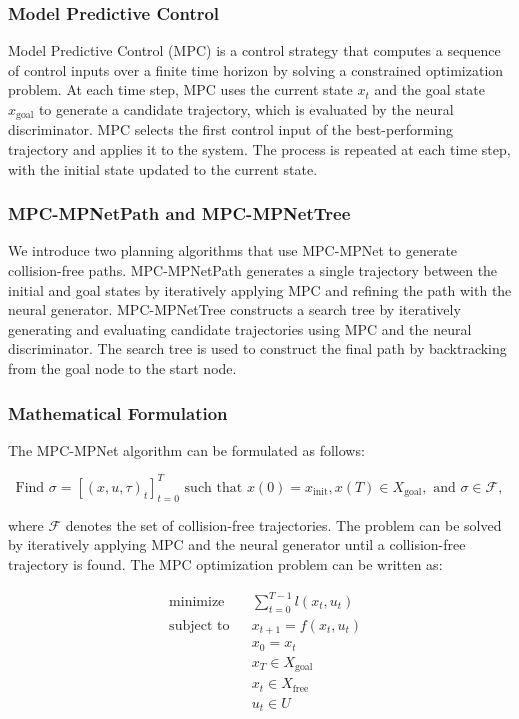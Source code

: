 \subsubsection{Model Predictive Control}

Model Predictive Control (MPC) is a control strategy that computes a sequence of control inputs over a finite time horizon by solving a constrained optimization problem. At each time step, MPC uses the current state $x_t$ and the goal state $x_{\text{goal}}$ to generate a candidate trajectory, which is evaluated by the neural discriminator. MPC selects the first control input of the best-performing trajectory and applies it to the system. The process is repeated at each time step, with the initial state updated to the current state.

\subsubsection{MPC-MPNetPath and MPC-MPNetTree}

We introduce two planning algorithms that use MPC-MPNet to generate collision-free paths. MPC-MPNetPath generates a single trajectory between the initial and goal states by iteratively applying MPC and refining the path with the neural generator. MPC-MPNetTree constructs a search tree by iteratively generating and evaluating candidate trajectories using MPC and the neural discriminator. The search tree is used to construct the final path by backtracking from the goal node to the start node.

\subsubsection{Mathematical Formulation}

The MPC-MPNet algorithm can be formulated as follows:

\begin{equation}
    \text{Find } \sigma = \left[(x, u, \tau)_t\right]_{t=0}^{T} \text{ such that } x(0) = x_{\text{init}}, x(T) \in X_{\text{goal}}, \text{ and } \sigma \in \mathcal{F},
\end{equation}

where $\mathcal{F}$ denotes the set of collision-free trajectories. The problem can be solved by iteratively applying MPC and the neural generator until a collision-free trajectory is found. The MPC optimization problem can be written as:

\begin{equation}
    \begin{aligned}
        &\text{minimize} && \sum_{t=0}^{T-1} l(x_t, u_t) \\
        &\text{subject to} && x_{t+1} = f(x_t, u_t) \\
        &&& x_0 = x_t \\
        &&& x_T \in X_{\text{goal}} \\
        &&& x_t \in X_{\text{free}} \\
        &&& u_t \in U \\
    \end{aligned}
\end{equation}

